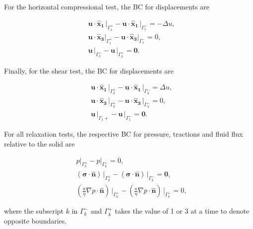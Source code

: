 \documentclass[draft]{agujournal2019}
\begin{document}
For the horizontal compressional test, the BC for displacements are
\begin{linenomath*}
\begin{equation}\label{Eq.9}
\begin{split}
& \bm{u} \cdot \bm{\hat{x}_1}\, \vert_{\Gamma_1^+}-\bm{u} \cdot \bm{\hat{x}_1}\, \vert_{\Gamma_1^-} = - \Delta u, \\
& \bm{u} \cdot \bm{\hat{x}_3} \vert_{\Gamma_1^+}- \bm{u} \cdot \bm{\hat{x}_3}\vert_{\Gamma_1^-} =  0,  \\
& \bm{u}\,\vert_{\Gamma_3^-}- \bm{u}\,\vert_{\Gamma_3^+} = \bm{0}.
\end{split}
\end{equation}
\end{linenomath*}

Finally, for the shear test, the BC for displacements are
\begin{linenomath*}
\begin{equation}\label{Eq.10}
\begin{split}
& \bm{u} \cdot \bm{\hat{x}_1}\,\vert_{\Gamma_3^+}- \bm{u} \cdot \bm{\hat{x}_1} \,\vert_{\Gamma_3^-} =\Delta u,\\
& \bm{u} \cdot \bm{\hat{x}_3}\,\vert_{\Gamma_3^+}- \bm{u} \cdot \bm{\hat{x}_3}\,\vert_{\Gamma_3^-} = 0, \\
& \bm{u}\,\vert_{\Gamma_1+}- \bm{u}\,\vert_{\Gamma_1^-} =\bm{0}.
\end{split}
\end{equation}
\end{linenomath*}

For all relaxation tests, the respective BC for pressure, tractions and fluid flux relative to the solid are
\begin{linenomath*}
\begin{equation}\label{Eq.11}
\begin{split}
& p\vert_{\Gamma_k^+}-p\vert_{\Gamma_k^-} =0, \\
& \left(\bm{\sigma}\cdot \bm{\hat n} \right)\, \vert_{\Gamma_k^+}-\left(\bm{\sigma}\cdot \bm{\hat n} \right)\, \vert_{\Gamma_k^-} = \bm{0},\\
&\left( \frac{\kappa}{\eta} \nabla p \cdot \bm{\hat n} \right) \, \vert_{\Gamma_k^+} -\left( \frac{\kappa}{\eta} \nabla p \cdot \bm{\hat n} \right) \, \vert_{\Gamma_k^-} = 0,
\end{split}
\end{equation}
\end{linenomath*}
where the subscript $k$ in $\Gamma_k^-$ and $\Gamma_k^+$ takes the value of 1 or 3 at a time to denote opposite boundaries.
\end{document}
